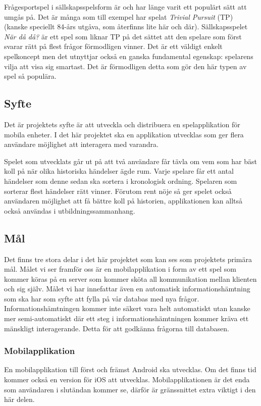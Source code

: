 \documentclass[12pt,a4paper]{article}
\begin{document}
Frågesportspel i sällskapsspelsform är och har länge varit ett populärt sätt att umgås på\cite{tp}. Det är många som till exempel har spelat \textit{Trivial Pursuit} (TP) (kanske speciellt 84-års utgåva, som återfinns lite här och där). Sällskapsspelet \textit{När då då?} är ett spel som liknar TP på det sättet att den spelare som först svarar rätt på flest frågor förmodligen vinner. Det är ett väldigt enkelt spelkoncept men det utnyttjar också en ganska fundamental egenskap: spelarens vilja att visa sig smartast. Det är förmodligen detta som gör den här typen av spel så populära.

\subsection{Syfte}
Det är projektets syfte är att utveckla och distribuera en spelapplikation för mobila enheter. I det här projektet ska en applikation utvecklas som ger flera användare möjlighet att interagera med varandra.

Spelet som utvecklats går ut på att två användare får tävla om vem som har bäst koll på när olika historiska händelser ägde rum. Varje spelare får ett antal händelser som denne sedan ska sortera i kronologisk ordning. Spelaren som sorterar flest händelser rätt vinner. Förutom rent nöje så ger spelet också användaren möjlighet att få bättre koll på historien, applikationen kan alltså också användas i utbildningssammanhang.

\subsection{Mål}
Det finns tre stora delar i det här projektet som kan ses som projektets primära mål. Målet vi ser framför oss är en mobilapplikation i form av ett spel som kommer köras på en server som kommer sköta all kommunikation mellan klienten och sig själv. Målet vi har innefattar även en automatisk informationshämtning som ska har som syfte att fylla på vår databas med nya frågor. Informationshämtningen kommer inte säkert vara helt automatiskt utan kanske mer semi-automatiskt där ett steg i informationshämtningen kommer kräva ett mänskligt interagerande. Detta för att godkänna frågorna till databasen. 


\subsubsection{Mobilapplikation}
En mobilapplikation till först och främst Android ska utvecklas. Om det finns tid kommer också en version för iOS att utvecklas. Mobilapplikationen är det enda som användaren i slutändan kommer se, därför är gränssnittet extra viktigt i den här delen. 
\end{document}
